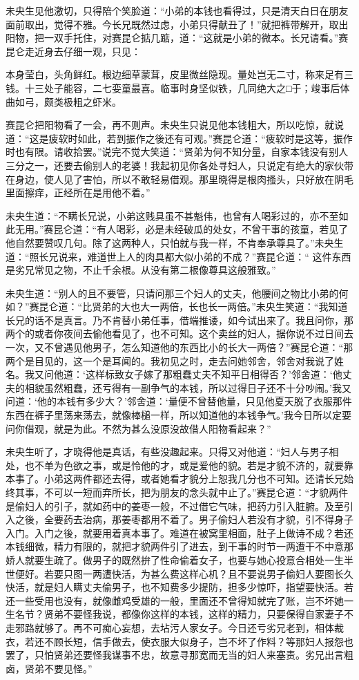 \documentclass[a4paper,12pt,UTF8,twoside]{ctexbook}
\begin{document}
未央生见他激切，只得陪个笑脸道：“小弟的本钱也看得过，只是清天白日在朋友面前取出，觉得不雅。今长兄既然过虑，小弟只得献丑了！”就把裤带解开，取出阳物，把一双手托住，对赛昆仑掂几踮，道：“这就是小弟的微本。长兄请看。”赛昆仑走近身去仔细一观，只见：

本身莹白，头角鲜红。根边细草蒙茸，皮里微丝隐现。量处岂无二寸，称来足有三钱。十三处子能容，二七娈童最喜。临事时身坚似铁，几同绝大之□于；竣事后体曲如弓，颇类极粗之虾米。

赛昆仑把阳物看了一会，再不则声。未央生只说见他本钱粗大，所以吃惊，就说道：“这是疲软时如此，若到振作之後还有可观。”赛昆仑道：“疲软时是这等，振作时也有限。请收拾罢。”说完不觉大笑道：“贤弟为何不知分量，自家本钱没有别人三分之一，还要去偷别人的老婆！我起初见你各处寻妇人，只说定有绝大的家伙带在身边，使人见了害怕，所以不敢轻易借观。那里晓得是根肉搔头，只好放在阴毛里面擦痒，正经所在是用他不着。”

未央生道：“不瞒长兄说，小弟这贱具虽不甚魁伟，也曾有人喝彩过的，亦不至如此无用。”赛昆仑道：“有人喝彩，必是未经破瓜的处女，不曾干事的孩童，若见了他自然要赞叹几句。除了这两种人，只怕就与我一样，不肯奉承尊具了。”未央生道：“照长兄说来，难道世上人的肉具都大似小弟的不成？”赛昆仑道：“
这件东西是劣兄常见之物，不止千余根。从没有第二根像尊具这般雅致。”

未央生道：“别人的且不要管，只请问那三个妇人的丈夫，他腰间之物比小弟的何如？”赛昆仑道：“比贤弟的大也大一两倍，长也长一两倍。”未央生笑道：“我知道长兄的话不是真言。乃不肯替小弟任事，借端推诿，如今试出来了。我且问你，那两个的或者你夜间去偷他看见了，也不可知。这个卖丝的妇人，据你说不过日间去一次，又不曾遇见他男子，怎么知道他的东西比小的长大一两倍？”赛昆仑道：“那两个是目见的，这一个是耳闻的。我初见之时，走去问她邻舍，邻舍对我说了姓名。我又问他道：‘这样标致女子嫁了那粗蠢丈夫不知平日相得否？’邻舍道：‘他丈夫的相貌虽然粗蠢，还亏得有一副争气的本钱，所以过得日子还不十分吵闹。’我又问道：‘他的本钱有多少大？’邻舍道：‘量便不曾替他量，只见他夏天脱了衣服那件东西在裤子里荡来荡去，就像棒槌一样，所以知道他的本钱争气。’我今日所以定要问你借观，就是为此。不然为甚么没原没故借人阳物看起来？”

未央生听了，才晓得他是真话，有些没趣起来。只得又对他道：“妇人与男子相处，也不单为色欲之事，或是怜他的才，或是爱他的貌。若是才貌不济的，就要靠本事了。小弟这两件都还去得，或者她看才貌分上恕我几分也不可知。还请长兄始终其事，不可以一短而弃所长，把为朋友的念头就中止了。”赛昆仑道：“才貌两件是偷妇人的引子，就如药中的姜枣一般，不过借它气味，把药力引入脏腑。及至引入之後，全要药去治病，那姜枣都用不着了。男子偷妇人若没有才貌，引不得身子入门。入门之後，就要用着真本事了。难道在被窝里相面，肚子上做诗不成？若还本钱细微，精力有限的，就把才貌两件引了进去，到干事的时节一两遭干不中意那娇人就要生疏了。做男子的既然拚了性命偷着女子，也要与她心投意合相处一生半世便好。若要只图一两遭快活，为甚么费这样心机？且不要说男子偷妇人要图长久快活，就是妇人瞒丈夫偷男子，也不知费多少提防，担多少惊吓，指望要快活。若还一些受用也没有，就像雌鸡受雄的一般，里面还不曾得知就完了账，岂不坏她一生名节？贤弟不要怪我说，都像你这样的本钱，这样的精力，只要保得自家妻子不走邪路就够了。再不可痴心妄想，去坫污人家女子。今日还亏劣兄老到，相体裁衣，若还不顾长短，信手做去，使衣服大似身子，岂不坏了作料？等那妇人报怨也罢了，只怕贤弟还要怪我谋事不忠，故意寻那宽而无当的妇人来塞责。劣兄出言粗卤，贤弟不要见怪。”
\end{document}
